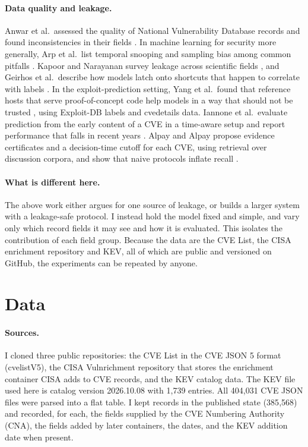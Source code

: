 \documentclass[11pt,a4paper]{article}
\begin{document}
\paragraph{Data quality and leakage.} Anwar et al.\ assessed the quality of National Vulnerability Database records and found inconsistencies in their fields \cite{anwar2022}. In machine learning for security more generally, Arp et al.\ list temporal snooping and sampling bias among common pitfalls \cite{arp2022}. Kapoor and Narayanan survey leakage across scientific fields \cite{kapoor2023}, and Geirhos et al.\ describe how models latch onto shortcuts that happen to correlate with labels \cite{geirhos2020}. In the exploit-prediction setting, Yang et al.\ found that reference hosts that serve proof-of-concept code help models in a way that should not be trusted \cite{yang2020}, using Exploit-DB labels and cvedetails data. Iannone et al.\ evaluate prediction from the early content of a CVE in a time-aware setup and report performance that falls in recent years \cite{iannone2024}. Alpay and Alpay propose evidence certificates and a decision-time cutoff for each CVE, using retrieval over discussion corpora, and show that naive protocols inflate recall \cite{alpay2026}.

\paragraph{What is different here.} The above work either argues for one source of leakage, or builds a larger system with a leakage-safe protocol. I instead hold the model fixed and simple, and vary only which record fields it may see and how it is evaluated. This isolates the contribution of each field group. Because the data are the CVE List, the CISA enrichment repository and KEV, all of which are public and versioned on GitHub, the experiments can be repeated by anyone.

\section{Data}

\paragraph{Sources.} I cloned three public repositories: the CVE List in the CVE JSON 5 format (cvelistV5), the CISA Vulnrichment repository that stores the enrichment container CISA adds to CVE records, and the KEV catalog data. The KEV file used here is catalog version 2026.10.08 with 1{,}739 entries. All 404{,}031 CVE JSON files were parsed into a flat table. I kept records in the published state (385{,}568) and recorded, for each, the fields supplied by the CVE Numbering Authority (CNA), the fields added by later containers, the dates, and the KEV addition date when present.
\end{document}
